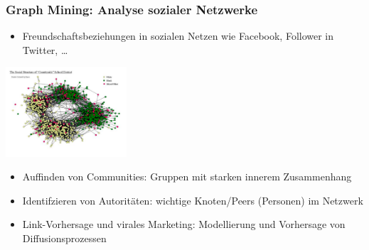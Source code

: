 


\begin{frame}
\frametitle{Graph Mining: Analyse sozialer Netzwerke}

\begin{itemize}
\item Freundschaftsbeziehungen in sozialen Netzen wie Facebook,
  Follower in Twitter, \dots
\end{itemize}

\begin{minipage}[c]{4.5cm}
\includegraphics[width=4.5cm]{fig1/graph.png}
\end{minipage}\quad
\begin{minipage}[c]{5.5cm}
{\small
\begin{itemize}
\item Auffinden von Communities: Gruppen mit starken innerem
  Zusammenhang
\item Identifzieren von Autoritäten: wichtige Knoten/Peers (Personen)
  im Netzwerk
\item Link-Vorhersage und virales Marketing: Modellierung und
  Vorhersage von Diffusionsprozessen
\end{itemize}}
\end{minipage}

\end{frame}

